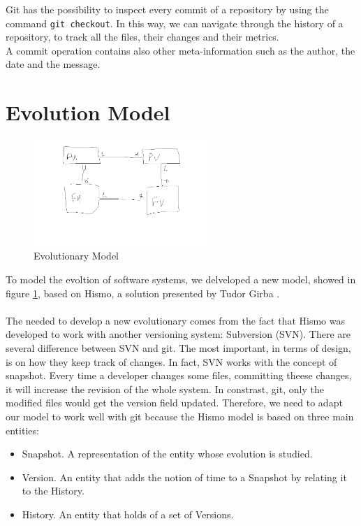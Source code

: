 Git has the possibility to inspect every commit of a repository by using the command \texttt{git checkout}. 
In this way, we can navigate through the history of a repository, to track all the files, their changes and their metrics.\\

A commit operation contains also other meta-information such as the author, the date and the message. 



\section{Evolution Model}

\begin{figure}[H]
    \includegraphics[width=0.6\textwidth]{EvolutionaryModel.jpg}
    \caption{Evolutionary Model}
    \label{fig:EvolutionaryModel1}
\end{figure}

To model the evoltion of software systems, we delveloped a new model, 
showed in figure \ref{fig:EvolutionaryModel1}, based on Hismo, a solution presented by Tudor Girba \cite{Girba2005}.\\
\\
The needed to develop a new evolutionary comes from the fact that Hismo was developed to work with another versioning system: Subversion (SVN). 
There are several difference between SVN and git. The most important, in terms of design, is on how they keep track of changes. 
In fact, SVN works with the concept of snapshot. Every time a developer changes some files, committing theese changes, it will increase the revision of the whole system. 
In constrast, git, only the modified files would get the version field updated. 
Therefore, we need to adapt our model to work well with git because the Hismo model is based on three main entities:
\begin{itemize}
    \item Snapshot. A representation of the entity whose evolution is studied.
    \item Version. An entity that adds the notion of time to a Snapshot by relating it to the History. 
    \item History. An entity that holds of a set of Versions.
\end{itemize}
\bigbreak

